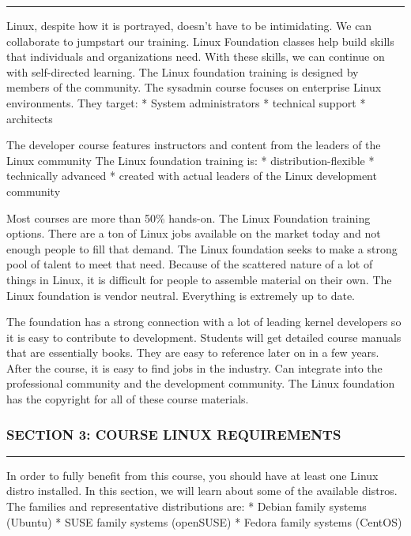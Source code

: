 \begin{center}\rule{3in}{0.4pt}\end{center}

Linux, despite how it is portrayed, doesn't have to be intimidating. We
can collaborate to jumpstart our training. Linux Foundation classes help
build skills that individuals and organizations need. With these skills,
we can continue on with self-directed learning. The Linux foundation
training is designed by members of the community. The sysadmin course
focuses on enterprise Linux environments. They target: * System
administrators * technical support * architects

The developer course features instructors and content from the leaders
of the Linux community The Linux foundation training is: *
distribution-flexible * technically advanced * created with actual
leaders of the Linux development community

Most courses are more than 50\% hands-on. The Linux Foundation training
options. There are a ton of Linux jobs available on the market today and
not enough people to fill that demand. The Linux foundation seeks to
make a strong pool of talent to meet that need. Because of the scattered
nature of a lot of things in Linux, it is difficult for people to
assemble material on their own. The Linux foundation is vendor neutral.
Everything is extremely up to date.

The foundation has a strong connection with a lot of leading kernel
developers so it is easy to contribute to development. Students will get
detailed course manuals that are essentially books. They are easy to
reference later on in a few years. After the course, it is easy to find
jobs in the industry. Can integrate into the professional community and
the development community. The Linux foundation has the copyright for
all of these course materials.

\subsubsection{SECTION 3: COURSE LINUX
REQUIREMENTS}\label{section-3-course-linux-requirements}

\begin{center}\rule{3in}{0.4pt}\end{center}

In order to fully benefit from this course, you should have at least one
Linux distro installed. In this section, we will learn about some of the
available distros. The families and representative distributions are: *
Debian family systems (Ubuntu) * SUSE family systems (openSUSE) * Fedora
family systems (CentOS)

